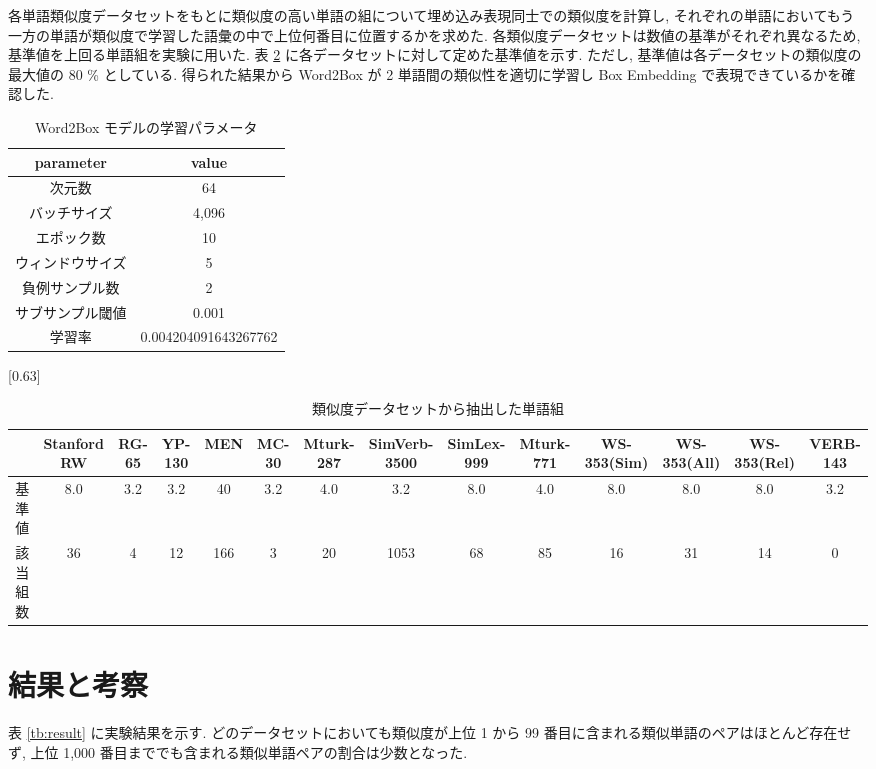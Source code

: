 \documentclass[twocolumn]{jarticle}     %
\begin{document}
各単語類似度データセットをもとに類似度の高い単語の組について埋め込み表現同士での類似度を計算し, それぞれの単語においてもう一方の単語が類似度で学習した語彙の中で上位何番目に位置するかを求めた. 
各類似度データセットは数値の基準がそれぞれ異なるため, 基準値を上回る単語組を実験に用いた. 
表 \ref{tb:dataset_detail} に各データセットに対して定めた基準値を示す. 
ただし, 基準値は各データセットの類似度の最大値の 80 \% としている. 
得られた結果から Word2Box が 2 単語間の類似性を適切に学習し Box Embedding で表現できているかを確認した. 

\begin{table}[th]
  \centering
  \caption{Word2Box モデルの学習パラメータ}
  \label{tb:model_parameter}
  \begin{tabular}{c|c} \hline
      parameter&value \\ \hline
      次元数&64 \\
      バッチサイズ&4,096 \\ 
      エポック数&10 \\
      ウィンドウサイズ&5 \\
      負例サンプル数&2 \\
      サブサンプル閾値&0.001 \\
      学習率&0.004204091643267762 \\
      \hline
  \end{tabular}
\end{table}

\begin{table}[th]
  \centering
  \caption{類似度データセットから抽出した単語組}
  \label{tb:dataset_detail}
  \scalebox{0.63}[0.63]{
		\begin{tabular}{c|ccccccccccccc}
			\hline
			
      & Stanford RW & RG-65 & YP-130 & MEN & MC-30 & Mturk-287 & SimVerb-3500 & SimLex-999 & Mturk-771 & WS-353(Sim) & WS-353(All) & WS-353(Rel) & VERB-143 \\ \hline
			基準値  & 8.0         & 3.2   & 3.2    & 40  & 3.2   & 4.0       & 3.2          & 8.0        & 4.0       & 8.0         & 8.0         & 8.0         & 3.2      \\
			該当組数 & 36          & 4     & 12     & 166 & 3     & 20        & 1053         & 68         & 85        & 16          & 31          & 14          & 0        \\ \hline
			\end{tabular}
  }
\end{table}

\section{結果と考察}
表 \ref{tb:result} に実験結果を示す. 
どのデータセットにおいても類似度が上位 1 から 99 番目に含まれる類似単語のペアはほとんど存在せず, 上位 1,000 番目まででも含まれる類似単語ペアの割合は少数となった. 
\end{document}
